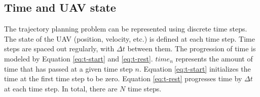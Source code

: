 \subsection{Time and UAV state}
\label{subsec:state}

The trajectory planning problem can be represented using discrete time steps. The state of the UAV (position, velocity, etc.) is defined at each time step. Time steps are spaced out regularly, with $\Delta t$ between them. The progression of time is modeled by Equation \ref{eq:t-start} and \ref{eq:t-rest}. $time_n$ represents the amount of time that has passed at a given time step $n$. Equation \ref{eq:t-start} initializes the time at the first time step to be zero. Equation \ref{eq:t-rest} progresses time by $\Delta t$ at each time step. In total, there are $N$ time steps.

